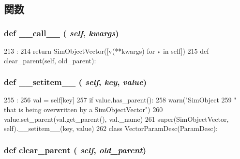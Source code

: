 \subsection{関数}
\hypertarget{classm5_1_1params_1_1SimObjectVector_ae844e0019d38360a86bac1474132db3c}{
\subsubsection[{\_\-\_\-call\_\-\_\-}]{\setlength{\rightskip}{0pt plus 5cm}def \_\-\_\-call\_\-\_\- ( {\em self}, \/   {\em kwargs})}}
\label{classm5_1_1params_1_1SimObjectVector_ae844e0019d38360a86bac1474132db3c}



\begin{DoxyCode}
213                                 :
214         return SimObjectVector([v(**kwargs) for v in self])
215 
    def clear_parent(self, old_parent):
\end{DoxyCode}
\hypertarget{classm5_1_1params_1_1SimObjectVector_a09195b01147e970ca71c48b57f653940}{
\subsubsection[{\_\-\_\-setitem\_\-\_\-}]{\setlength{\rightskip}{0pt plus 5cm}def \_\-\_\-setitem\_\-\_\- ( {\em self}, \/   {\em key}, \/   {\em value})}}
\label{classm5_1_1params_1_1SimObjectVector_a09195b01147e970ca71c48b57f653940}



\begin{DoxyCode}
255                                      :
256         val = self[key]
257         if value.has_parent():
258             warn("SimObject %
259                  " that is being overwritten by a SimObjectVector")
260         value.set_parent(val.get_parent(), val._name)
261         super(SimObjectVector, self).__setitem__(key, value)
262 
class VectorParamDesc(ParamDesc):
\end{DoxyCode}
\hypertarget{classm5_1_1params_1_1SimObjectVector_a087680f475bb0223aaae928a37e04c3e}{
\subsubsection[{clear\_\-parent}]{\setlength{\rightskip}{0pt plus 5cm}def clear\_\-parent ( {\em self}, \/   {\em old\_\-parent})}}
\label{classm5_1_1params_1_1SimObjectVector_a087680f475bb0223aaae928a37e04c3e}



